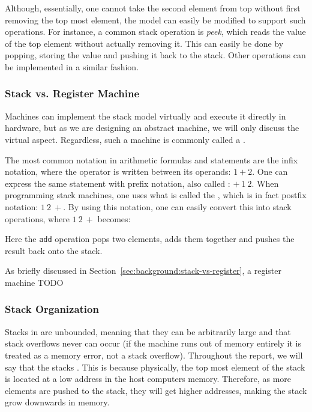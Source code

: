
Although, essentially, one cannot take the second element from top without first
removing the top most element, the model can easily be modified to support such
operations. For instance, a common stack operation is {\it peek}, which reads
the value of the top element without actually removing it. This can easily be
done by popping, storing the value and pushing it back to the stack. Other
operations can be implemented in a similar fashion. %

\subsubsection{Stack vs. Register Machine}
Machines can implement the stack model virtually and execute it directly in
hardware, but as we are designing an abstract machine, we will only discuss the
virtual aspect. Regardless, such a machine is commonly called a .

The most common notation in arithmetic formulas and statements are the infix
notation, where the operator is written between its operands: $1 + 2$. One can
express the same statement with prefix notation, also called : $+\ 1\ 2$. When programming stack machines, one uses what is called
the , which is in fact postfix notation:
$1\ 2\ +$. By using this notation, one can easily convert this into stack
operations, where $1\ 2\ +$ becomes:
\begin{stackops}
\end{stackops}

Here the {\tt add} operation pops two elements, adds them together and pushes
the result back onto the stack.

As briefly discussed in Section~\ref{sec:background:stack-vs-register}, a
register machine TODO

\subsubsection{Stack Organization}

Stacks in \thename{} are unbounded, meaning that they can be arbitrarily large
and that stack overflows never can occur (if the machine runs out of memory
entirely it is treated as a memory error, not a stack overflow). Throughout the
report, we will say that the stacks . This is because
physically, the top most element of the stack is located at a low address in the
host computers memory. Therefore, as more elements are pushed to the stack, they
will get higher addresses, making the stack grow downwards in memory.

